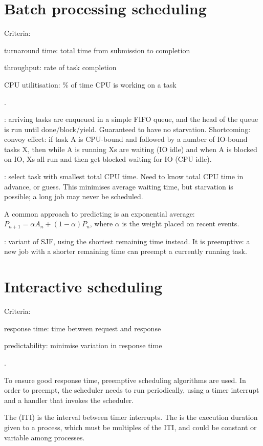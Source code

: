 \documentclass[fontsize=9pt]{slnotes}
\begin{document}
\section{Batch processing scheduling}
Criteria: \begin{slinenum}
\item turnaround time: total time from submission to completion
\item throughput: rate of task completion
\item CPU utilitisation: \% of time CPU is working on a task
\end{slinenum}.

: arriving tasks are enqueued in a simple FIFO queue, and the head of the queue is run until done/block/yield. Guaranteed to have no starvation. Shortcoming: convoy effect: if task A is CPU-bound and followed by a number of IO-bound tasks X, then while A is running Xs are waiting (IO idle) and when A is blocked on IO, Xs all run and then get blocked waiting for IO (CPU idle).

: select task with smallest total CPU time. Need to know total CPU time in advance, or guess. This minimises average waiting time, but starvation is possible; a long job may never be scheduled.

A common approach to predicting is an exponential average: \(P_{n+1} = \alpha A_n + (1-\alpha) P_n\), where \(\alpha\) is the weight placed on recent events.

: variant of SJF, using the shortest remaining time instead. It is preemptive: a new job with a shorter remaining time can preempt a currently running task.

\section{Interactive scheduling}
Criteria: \begin{slinenum}
\item response time: time between request and response
\item predictability: minimise variation in response time
\end{slinenum}.

To ensure good response time, preemptive scheduling algorithms are used. In order to preempt, the scheduler needs to run periodically, using a timer interrupt and a handler that invokes the scheduler.

The  (ITI) is the interval between timer interrupts. The  is the execution duration given to a process, which must be multiples of the ITI, and could be constant or variable among processes.
\end{document}
